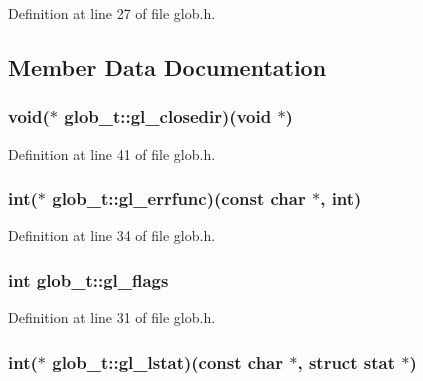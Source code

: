 Definition at line 27 of file glob.\-h.



\subsection{Member Data Documentation}
\hypertarget{structglob__t_a08551e369908622a2901438b76fba875}{
\subsubsection[{gl\-\_\-closedir}]{\setlength{\rightskip}{0pt plus 5cm}void($\ast$ glob\-\_\-t\-::gl\-\_\-closedir)(void $\ast$)}}\label{structglob__t_a08551e369908622a2901438b76fba875}


Definition at line 41 of file glob.\-h.

\hypertarget{structglob__t_a8e8b58f01273eb64976b54273286db5b}{
\subsubsection[{gl\-\_\-errfunc}]{\setlength{\rightskip}{0pt plus 5cm}int($\ast$ glob\-\_\-t\-::gl\-\_\-errfunc)(const char $\ast$, int)}}\label{structglob__t_a8e8b58f01273eb64976b54273286db5b}


Definition at line 34 of file glob.\-h.

\hypertarget{structglob__t_a1e09b682379e4687de3b58b14ffc2a38}{
\subsubsection[{gl\-\_\-flags}]{\setlength{\rightskip}{0pt plus 5cm}int glob\-\_\-t\-::gl\-\_\-flags}}\label{structglob__t_a1e09b682379e4687de3b58b14ffc2a38}


Definition at line 31 of file glob.\-h.

\hypertarget{structglob__t_ac6f254caa51d3574cb423ee575b39c07}{
\subsubsection[{gl\-\_\-lstat}]{\setlength{\rightskip}{0pt plus 5cm}int($\ast$ glob\-\_\-t\-::gl\-\_\-lstat)(const char $\ast$, struct stat $\ast$)}}\label{structglob__t_ac6f254caa51d3574cb423ee575b39c07}


